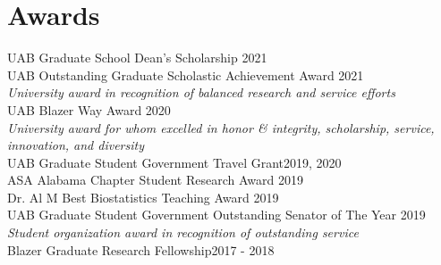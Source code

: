 \section{Awards} 
UAB Graduate School Dean's Scholarship \hfill 2021\\

UAB Outstanding Graduate Scholastic Achievement Award \hfill 2021\\
\textit{University award in recognition of balanced research and service efforts}\\

UAB Blazer Way Award \hfill 2020\\
\textit{University award for whom excelled in honor \& integrity, scholarship, service, innovation, and diversity}\\

UAB Graduate Student Government Travel Grant\hfill 2019, 2020\\

ASA Alabama Chapter Student Research Award \hfill 2019\\

Dr. Al M Best Biostatistics Teaching Award \hfill 2019\\

UAB Graduate Student Government Outstanding Senator of The Year \hfill 2019\\
\textit{Student organization award in recognition of outstanding service}\\

Blazer Graduate Research Fellowship\hfill 2017 - 2018
